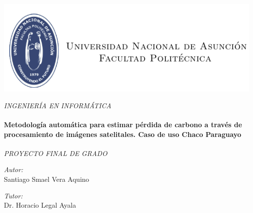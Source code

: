 \documentclass[11pt, a4paper, oneside]{Thesis} %
\begin{document}
\begin{titlepage}
\begin{center}
\includegraphics[scale=1]{./Figures/logo.png} %

\large \textit{INGENIERÍA EN INFORMÁTICA}\\[0.3cm]

\HRule \\[0.4cm] %
{\huge \bfseries Metodolog\'ia autom\'atica para estimar p\'erdida de
	carbono a trav\'es de procesamiento de im\'agenes
	satelitales. Caso de uso Chaco Paraguayo}\\[0.4cm] %
\HRule \\[1.5cm] %
 
\large \textit{PROYECTO FINAL DE GRADO}\\[0.3cm]
 

 \vfill
 
\vfill

\vfill

\begin{minipage}{0.4\textwidth}
\begin{center} \large
\emph{Autor:}\\
{Santiago Smael Vera Aquino}
\end{center}
\end{minipage} 
 \hfill\begin{minipage}{0.4\textwidth}
\begin{center} \large
\emph{Tutor:}\\ 
{Dr. Horacio Legal Ayala} \\


\end{center}
\end{minipage}
\end{center}
\end{titlepage}
\end{document}
